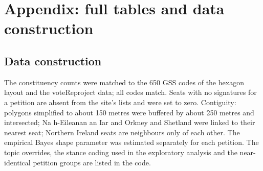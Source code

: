 \documentclass[11pt,a4paper]{article}
\begin{document}
\clearpage
\appendix
\section{Appendix: full tables and data construction}
\subsection{Data construction}
The constituency counts were matched to the 650 GSS codes of the hexagon layout and the voteReproject data; all codes match. Seats with no signatures for a petition are absent from the site's lists and were set to zero. Contiguity: polygons simplified to about 150 metres were buffered by about 250 metres and intersected; Na h-Eileanan an Iar and Orkney and Shetland were linked to their nearest seat; Northern Ireland seats are neighbours only of each other. The empirical Bayes shape parameter was estimated separately for each petition. The topic overrides, the stance coding used in the exploratory analysis and the near-identical petition groups are listed in the code.
\end{document}

